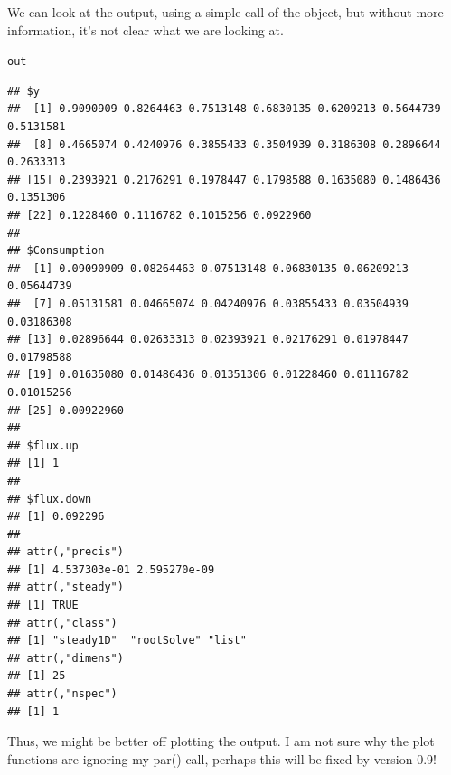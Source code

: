 \documentclass{tufte-handout}\usepackage[]{graphicx}\usepackage[]{xcolor}
\makeatletter
\newcommand{\hlstd}[1]{\textcolor[rgb]{0.345,0.345,0.345}{#1}}%
\newenvironment{kframe}{%
 \def\at@end@of@kframe{}%
 \ifinner\ifhmode%
  \def\at@end@of@kframe{\end{minipage}}%
  \begin{minipage}{\columnwidth}%
 \fi\fi%
 \def\FrameCommand##1{\hskip\@totalleftmargin \hskip-\fboxsep
 \colorbox{shadecolor}{##1}\hskip-\fboxsep
     \hskip-\linewidth \hskip-\@totalleftmargin \hskip\columnwidth}%
 \MakeFramed {\advance\hsize-\width
   \@totalleftmargin\z@ \linewidth\hsize
   \@setminipage}}%
 {\par\unskip\endMakeFramed%
 \at@end@of@kframe}
\newenvironment{knitrout}{}{} %
\makeatother
\begin{document}
We can look at the output, using a simple call of the object, but without more information, it's not clear what we are looking at. 
\begin{knitrout}
\color{fgcolor}\begin{kframe}
\begin{alltt}
\hlstd{out}
\end{alltt}
\begin{verbatim}
## $y
##  [1] 0.9090909 0.8264463 0.7513148 0.6830135 0.6209213 0.5644739 0.5131581
##  [8] 0.4665074 0.4240976 0.3855433 0.3504939 0.3186308 0.2896644 0.2633313
## [15] 0.2393921 0.2176291 0.1978447 0.1798588 0.1635080 0.1486436 0.1351306
## [22] 0.1228460 0.1116782 0.1015256 0.0922960
## 
## $Consumption
##  [1] 0.09090909 0.08264463 0.07513148 0.06830135 0.06209213 0.05644739
##  [7] 0.05131581 0.04665074 0.04240976 0.03855433 0.03504939 0.03186308
## [13] 0.02896644 0.02633313 0.02393921 0.02176291 0.01978447 0.01798588
## [19] 0.01635080 0.01486436 0.01351306 0.01228460 0.01116782 0.01015256
## [25] 0.00922960
## 
## $flux.up
## [1] 1
## 
## $flux.down
## [1] 0.092296
## 
## attr(,"precis")
## [1] 4.537303e-01 2.595270e-09
## attr(,"steady")
## [1] TRUE
## attr(,"class")
## [1] "steady1D"  "rootSolve" "list"     
## attr(,"dimens")
## [1] 25
## attr(,"nspec")
## [1] 1
\end{verbatim}
\end{kframe}
\end{knitrout}

Thus, we might be better off plotting the output. I am not sure why the plot functions are ignoring my par() call, perhaps this will be fixed by version 0.9!
\end{document}
